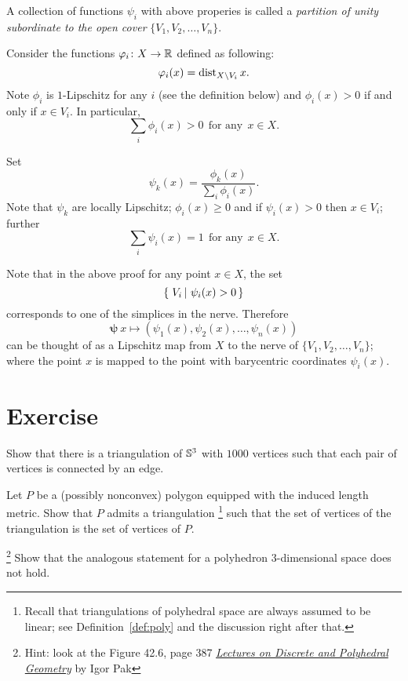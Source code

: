 A collection of functions $\psi_i$ with above properies is called 
a \emph{partition of unity subordinate to the open cover} $\{V_1,V_2,\dots,V_n\}$.

Consider the functions $\varphi_i\colon X\to\mathbb{R}$ defined as following:
$$\varphi_i(x)=\operatorname{dist}_{X\backslash V_i} x.$$
Note $\phi_i$ is $1$-Lipschitz
for any $i$ (see the definition below)
and $\phi_i(x)>0$ if and only if $x\in V_i$.
In particular, 
$$\sum_i\phi_i(x)>0\ \ \text{for any}\ \ x\in X.$$

Set 
$$\psi_k(x)=\frac{\phi_k(x)}{\sum_i\phi_i(x)}.$$
Note that
$\psi_k$ are locally Lipschitz;
$\phi_i(x)\ge 0$ and
if $\psi_i(x)>0$ then $x\in V_i$;
further
$$\sum_i\psi_i(x)=1\ \ \text{for any}\ \ x\in X.$$
\qedsf


Note that in the above proof for any point $x\in X$,
the set
$$\set{V_i}{\psi_i(x)>0}$$
corresponds to one of the simplices in the nerve.
Therefore 
$$\bm{\psi}\:x\mapsto(\psi_1(x),\psi_2(x),\dots,\psi_n(x))$$
can be thought of as a Lipschitz map from $X$ to the nerve of $\{V_1,V_2,\dots,V_n\}$;
where the point $x$ is mapped to the point with barycentric coordinates $\psi_i(x)$.

\section*{Exercise}

\begin{pr}\label{pr:1000}
Show that there is a triangulation of $\mathbb{S}^3$
with $1000$ vertices such that each pair of vertices is connected by an edge. 
\end{pr}

\begin{pr}\label{pr:tringulation-of-poly} Let $P$ be a (possibly nonconvex) polygon
 equipped with the induced length metric.
Show that $P$ admits a triangulation%
\footnote{\label{trig+poly}Recall that triangulations of polyhedral space are always assumed to be linear;
see Definition~\ref{def:poly} and the discussion right after that.}
such that the set of vertices of the triangulation is the set of vertices of $P$. 
\end{pr}

\begin{pr}\footnote{Hint: look at the Figure 42.6, page 387 \href{http://www.math.ucla.edu/~pak/geompol8.pdf}{\textit{Lectures on Discrete and Polyhedral Geometry}} by
Igor Pak}
\label{pr:tringulation-of-poly-3D}
Show that the analogous statement for a polyhedron 3-dimensional space does not hold.
\end{pr}



